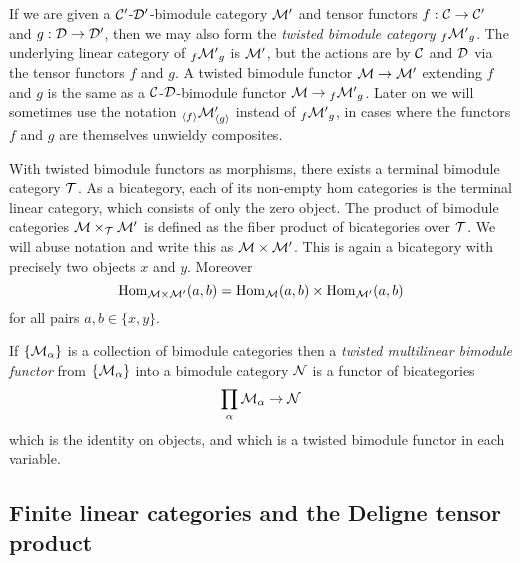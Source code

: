\documentclass[a4paper]{amsart}
\begin{document}
If we are given a $\mathcal C'$-$\mathcal D'$-bimodule category $\mathcal M'$ and tensor functors $f:\mathcal C \to \mathcal C'$ and $g:\mathcal D \to \mathcal D'$, then we may also form the {\em twisted bimodule category} ${}_f{\mathcal M'}_g$.  The underlying linear category of ${}_f{\mathcal M'}_g$ is $\mathcal M'$, but the actions are by $\mathcal C$ and $\mathcal D$ via the tensor functors $f$ and $g$. A twisted bimodule functor $\mathcal M \to \mathcal M'$ extending $f$ and $g$ is the same as a $\mathcal C$-$\mathcal D$-bimodule functor $\mathcal M \to {}_f{\mathcal M'}_g$.  Later on we will sometimes use the notation ${}_{\langle f \rangle} \mathcal M'_{\langle g \rangle}$ instead of ${}_f{\mathcal M'}_g$, in cases where the functors $f$ and $g$ are themselves unwieldy composites.

With twisted bimodule functors as morphisms, there exists a terminal bimodule category $\mathcal T$. As a bicategory, each of its non-empty hom categories is the terminal linear category, which consists of only the zero object. %
The product of bimodule categories $\mathcal M \times_{\mathcal T} \mathcal M'$ is defined as the fiber product of bicategories over $\mathcal T$.     We will abuse notation and write this as $\mathcal M \times \mathcal M'$. This is again a bicategory with precisely two objects $x$ and $y$. Moreover
\begin{equation*}
	\operatorname{Hom}_{\mathcal M \times \mathcal M'}(a,b) = \operatorname{Hom}_\mathcal M(a,b) \times \operatorname{Hom}_{\mathcal M'}(a,b)
\end{equation*}
for all pairs $a,b \in \{ x,y \}$.

If $\{ \mathcal M_\alpha \}$ is a collection of bimodule categories then a {\em twisted multilinear bimodule functor} from $\{ \mathcal M_\alpha \}$ into a bimodule category $\mathcal N$ is a functor of bicategories
\begin{equation*}
	\prod_{\alpha} \mathcal M_\alpha \to \mathcal N
\end{equation*}
which is the identity on objects, and which is a twisted bimodule functor in each variable. 

\subsection{Finite linear categories and the Deligne tensor product} \label{sec-tc-deligne}
\end{document}
